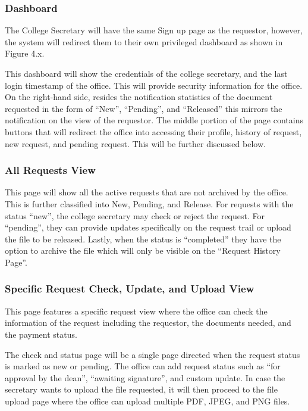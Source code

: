 \subsubsection{Dashboard}
The College Secretary will have the same Sign up page as the requestor, however, the system will redirect them to their own privileged dashboard as shown in Figure 4.x. 

This dashboard will show the credentials of the college secretary, and the last login timestamp of the office. This will provide security information for the office. On the right-hand side, resides the notification statistics of the document requested in the form of “New”, “Pending”, and “Released” this mirrors the notification on the view of the requestor. The middle portion of the page contains buttons that will redirect the office into accessing their profile, history of request, new request, and pending request. This will be further discussed below.

\subsubsection{All Requests View}

This page will show all the active requests that are not archived by the office. This is further classified into New, Pending, and Release. For requests with the status “new”, the college secretary may check or reject the request. For “pending”, they can provide updates specifically on the request trail or upload the file to be released. Lastly, when the status is “completed”  they have the option to archive the file which will only be visible on the “Request History Page”.

\subsubsection{Specific Request Check, Update, and Upload View}

This page features a specific request view where the office can check the information of the request including the requestor, the documents needed, and the payment status.

The check and status page will be a single page directed when the request status is marked as new or pending. The office can add request status such as “for approval by the dean”, “awaiting signature”, and custom update. In case the secretary wants to upload the file requested, it will then proceed to the file upload page where the office can upload multiple PDF, JPEG, and PNG files.

